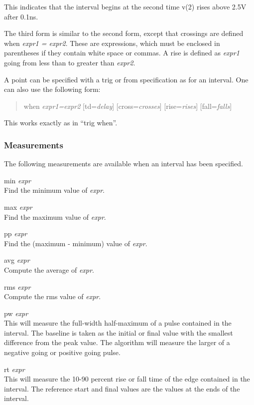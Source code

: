 
This indicates that the interval begins at the second time {\vt v(2)} rises
above 2.5V after 0.1ns.

The third form is similar to the second form, except that crossings
are defined when {\it expr1 = expr2}.  These are expressions, which
must be enclosed in parentheses if they contain white space or commas. 
A rise is defined as {\it expr1} going from less than to greater than
{\it expr2}.

A point can be specified with a {\vt trig} or {\vt from}
specification as for an interval.  One can also use the following
form:
\begin{quote}\vt
       when {\it expr1=expr2} [td={\it delay}]
       [cross={\it crosses}] [rise={\it rises}] [fall={\it falls}]
\end{quote}

This works exactly as in ``{\vt trig when}''.

\subsubsection{Measurements}
The following measurements are available when an interval has been
specified.

\begin{description}
\item{{\vt min} {\it expr}}\\
Find the minimum value of {\it expr\/}.
\item{{\vt max} {\it expr}}\\
Find the maximum value of {\it expr\/}.
\item{{\vt pp} {\it expr}}\\
Find the (maximum - minimum) value of {\it expr\/}.
\item{{\vt avg} {\it expr}}\\
Compute the average of {\it expr\/}.
\item{{\vt rms} {\it expr}}\\
Compute the rms value of {\it expr\/}.
\item{{\vt pw} {\it expr}}\\
This will measure the full-width half-maximum of a pulse contained in
the interval.  The baseline is taken as the initial or final value
with the smallest difference from the peak value.  The algorithm will
measure the larger of a negative going or positive going pulse.
\item{{\vt rt} {\it expr}}\\
This will measure the 10-90 percent rise or fall time of the edge
contained in the interval.  The reference start and final values are
the values at the ends of the interval.
\end{description}

